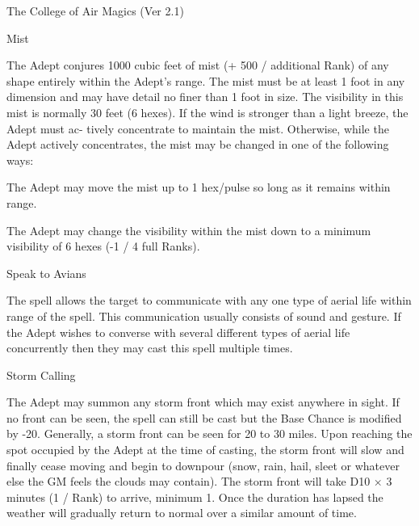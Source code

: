 \begin{Chapter}{The College of Air Magics (Ver 2.1)}
\begin{spell}[G-4]{Mist}

\begin{effects}
The Adept conjures 1000 cubic feet of mist (+ 500 / additional Rank)
of any shape entirely within the Adept’s range. The mist must be at
least 1 foot in any dimension and may have detail no finer than 1 foot
in size. The visibility in this mist is normally 30 feet (6 hexes).
If the wind is stronger than a light breeze, the Adept must ac- tively
concentrate to maintain the mist. Otherwise, while the Adept actively
concentrates, the mist may be changed in one of the following ways:
\begin{Enumerate}
\item The Adept may move the mist up to 1 hex/pulse so long as it
  remains within range.

\item The Adept may change the visibility within the mist down to a
  minimum visibility of 6 hexes (-1 / 4 full Ranks).
\end{Enumerate}
\end{effects}
\end{spell}

\begin{spell}[G-5]{Speak to Avians}

\begin{effects}
The spell allows the target to communicate with any one type of aerial
life within range of the spell.  This communication usually consists
of sound and gesture. If the Adept wishes to converse with several
different types of aerial life concurrently then they may cast this
spell multiple times.
\end{effects}
\end{spell}

\begin{spell}[G-6]{Storm Calling}

\begin{effects}
The Adept may summon any storm front which may exist anywhere in
sight. If no front can be seen, the spell can still be cast but the
Base Chance is modified by -20.  Generally, a storm front can be seen
for 20 to 30 miles. Upon reaching the spot occupied by the Adept at
the time of casting, the storm front will slow and finally cease
moving and begin to downpour (snow, rain, hail, sleet or whatever else
the GM feels the clouds may contain).  The storm front will take D10 ×
3 minutes (1 / Rank) to arrive, minimum 1.  Once the duration has
lapsed the weather will gradually return to normal over a similar
amount of time.
\end{effects}
\end{spell}


\end{Chapter}
